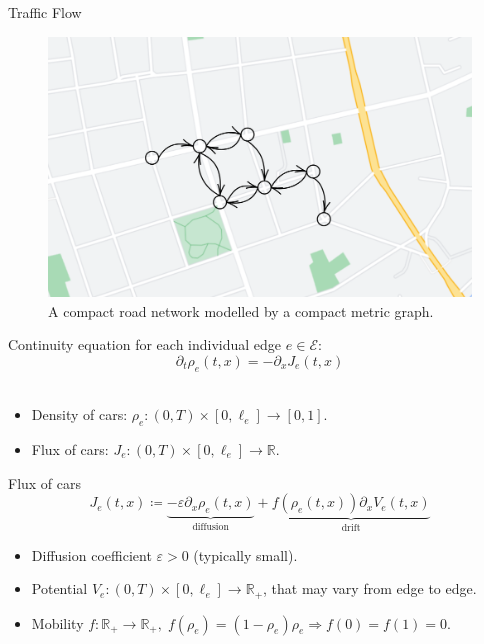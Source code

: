 \documentclass[9pt]{beamer}
\begin{document}
\begin{frame}{Traffic Flow}
    \begin{figure}[H]
        \begin{center}
            \includegraphics[scale=0.15]{img/diagram-20220316.png}
        \end{center}
        \caption{A compact road network modelled by a compact metric graph.}
    \end{figure}
    Continuity equation for each individual edge $e \in \mathcal{E}$:
    \begin{equation*}
        \partial_t \rho_e  \left( t,x \right)  = - \partial_x J_e \left( t,x \right)
    \end{equation*} \\
    \begin{itemize}
        \item Density of cars: $\rho_e \colon  \left( 0, T \right)  \times \left[ 0, \ell_e \right] \to \left[0, 1\right]$.
        \item Flux of cars: $J_e \colon  \left( 0,T \right)  \times \left[ 0, \ell_e \right] \to \mathbb{R}$.
    \end{itemize}
\end{frame}



\begin{frame}{Flux of cars}
    \begin{equation*} 
        J_e \left( t,x \right)  \coloneqq \underbrace{- \varepsilon \partial_x \rho_e  \left( t, x \right)}_{\text{diffusion}}  + \underbrace{f \left( \rho_e \left( t, x \right)  \right)  \partial_x V_e \left( t, x \right)}_{\text{drift}} 
    \end{equation*}
    \vspace{3mm}
    \begin{itemize}
        \item Diffusion coefficient $\varepsilon > 0$ (typically small).
        \item Potential $V_e \colon  \left( 0,T \right)  \times \left[ 0, \ell_e \right] \to \mathbb{R}_{+}$, that may vary from edge to edge.
        \item Mobility $f \colon \mathbb{R}_{+} \to \mathbb{R}_{+}, \; f \left( \rho_e \right)  =  \left( 1-\rho_e \right)  \rho_e \Rightarrow f \left( 0 \right)  = f \left( 1 \right)  = 0$. 
    \end{itemize}
\end{frame}
\end{document}
